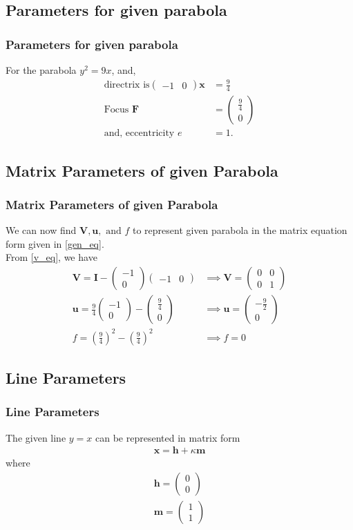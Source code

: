 \documentclass{beamer}
\providecommand{\brak}[1]{\ensuremath{\left(#1\right)}}
\theoremstyle{remark}
\newcommand{\myvec}[1]{\ensuremath{\begin{pmatrix}#1\end{pmatrix}}}
\let\vec\mathbf
\numberwithin{equation}{section}
\begin{document}
\subsection{Parameters for given parabola}
\begin{frame}
  \frametitle{Parameters for given parabola}
  For the parabola $y^2 = 9 x$, and,
  \begin{align}
    \text{directrix is} \myvec{-1&0}\vec{x} &= \frac{9}{4}\\
    \text{Focus } \vec{F} &= \myvec{\frac{9}{4}\\0}\\
    \text{and, eccentricity } e &= 1.
  \end{align}
\end{frame}

\subsection{Matrix Parameters of given Parabola}
\begin{frame}
  \frametitle{Matrix Parameters of given Parabola}
  We can now find $\vec{V}, \vec{u}, \text{ and } f$ to represent given parabola in the matrix equation form given in \ref{gen_eq}.\\
  From \ref{v_eq}, we have
  \begin{align}
    \vec{V} = \vec{I}  - \myvec{-1\\0} \myvec{-1&0} &\implies \vec{V} = \myvec{0&0\\0&1}\\
    \vec{u} = \frac{9}{4} \myvec{-1\\0} - \myvec{\frac{9}{4}\\0} &\implies \vec{u} = \myvec{-\frac{9}{2}\\0} \\
    f = \brak{\frac{9}{4}}^2 - \brak{\frac{9}{4}}^2  &\implies f = 0
  \end{align}
\end{frame}



\subsection{Line Parameters}
\begin{frame}
  \frametitle{Line Parameters}
  The given line $y=x$ can be represented in matrix form 
  \begin{align}
    \vec{x} = \vec{h} + \kappa \vec{m}
  \end{align}
  where
  \begin{align}
    \vec{h} = \myvec{0\\0} \\
    \vec{m} = \myvec{1\\1}
  \end{align}
\end{frame}
\end{document}
